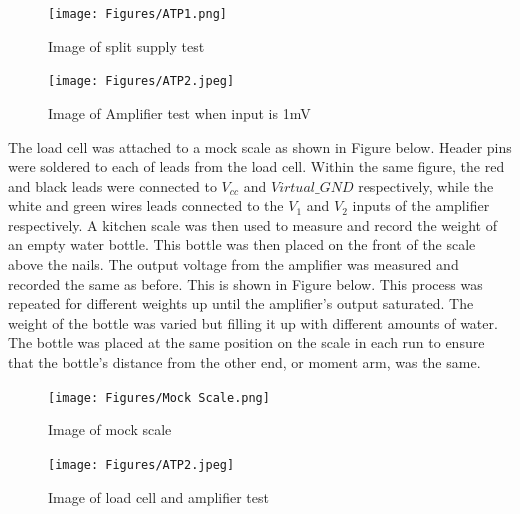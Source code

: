 \documentclass[class=report,11pt,crop=false]{standalone}
\begin{document}
	\begin{figure}[h!]
		\centering
		\texttt{[image: Figures/ATP1.png]}
		\caption{Image of split supply test}
		\label{fig:S7}
	\end{figure}
	
	\begin{figure}[h!]
		\centering
		\texttt{[image: Figures/ATP2.jpeg]}
		\caption{Image of Amplifier test when input is 1mV}
		\label{fig:S8}
	\end{figure}
	
	The load cell was attached to a mock scale as shown in Figure below. Header pins were soldered to each of leads from the load cell. Within the same figure, the red and black leads were connected to $V_{cc}$ and $Virtual\_GND$ respectively, while the white and green wires leads connected to the $V_1$ and $V_2$ inputs of the amplifier respectively. A kitchen scale was then used to measure and record the weight of an empty water bottle. This bottle was then placed on the front of the scale above the nails. The output voltage from the amplifier was measured and recorded the same as before. This is shown in Figure below. This process was repeated for different weights up until the amplifier's output saturated. The weight of the bottle was varied but filling it up with different amounts of water. The bottle was placed at the same position on the scale in each run to ensure that the bottle's distance from the other end, or moment arm, was the same. 
	\begin{figure}[h!]
		\centering
		\texttt{[image: Figures/Mock Scale.png]}
		\caption{Image of mock scale}
		\label{fig:S9}
	\end{figure}
	
	\begin{figure}[h!]
		\centering
		\texttt{[image: Figures/ATP2.jpeg]}
		\caption{Image of load cell and amplifier test}
		\label{fig:S10}
	\end{figure}
	\ifstandalone
	
	\printnoidxglossary[type=\acronymtype,nonumberlist]
	\fi
\end{document}
